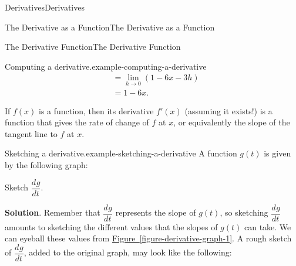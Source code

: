 \documentclass[10pt,]{book}
\numberwithin{equation}{section}
\newcommand{\dv}[3][]{\dfrac{d^{#1} #2}{d #3^{#1}}}
\begin{document}
\begin{chapterptx}{Derivatives}{}{Derivatives}{}{}
\begin{sectionptx}{The Derivative as a Function}{}{The Derivative as a Function}{}{}
\begin{subsectionptx}{The Derivative Function}{}{The Derivative Function}{}{}
\begin{example}{Computing a derivative.}{example-computing-a-derivative}
\begin{align*}
& = \lim_{h\to0}(1-6x-3h) \\
& = 1-6x. 
\end{align*}
%
\end{example}
\hypertarget{p-104}{}%
If \(f(x)\) is a function, then its derivative \(f'(x)\) (assuming it exists!) is a function that gives the rate of change of \(f\) at \(x\), or equivalently the slope of the tangent line to \(f\) at \(x\).%
\begin{example}{Sketching a derivative.}{example-sketching-a-derivative}%
\hypertarget{p-105}{}%
A function \(g(t)\) is given by the following graph: \begin{figure}
\centering
{
}
\end{figure}
%
\par
\hypertarget{p-106}{}%
Sketch \(\dv{g}{t}\).%
\par\smallskip%
\noindent\textbf{Solution}.\hypertarget{solution-23}{}\quad%
\hypertarget{p-107}{}%
Remember that \(\dv{g}{t}\) represents the slope of \(g(t)\), so sketching \(\dv{g}{t}\) amounts to sketching the different values that the slopes of \(g(t)\) can take. We can eyeball these values from \hyperref[figure-derivative-graph-1]{Figure~\ref{figure-derivative-graph-1}}. A rough sketch of \(\dv{g}{t}\), added to the original graph, may look like the following: \begin{figure}
\centering
{
}
\end{figure}
\end{example}
\end{subsectionptx}
\end{sectionptx}
\end{chapterptx}
\end{document}
